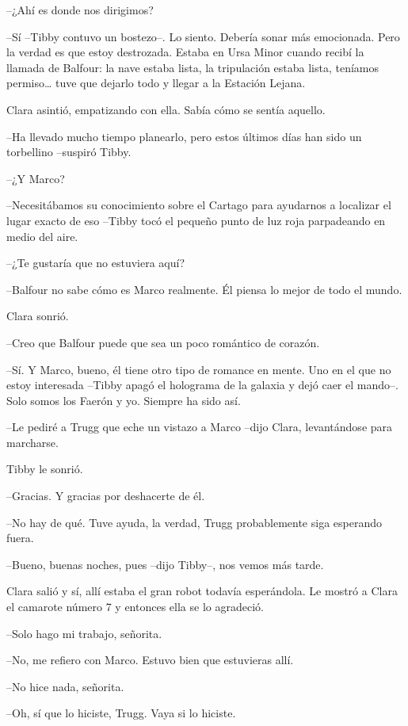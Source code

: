 {--¿Ahí es donde nos dirigimos?}

{--Sí --Tibby contuvo un bostezo--. Lo siento. Debería sonar más
 emocionada. Pero la verdad es que estoy destrozada. Estaba en Ursa Minor
 cuando recibí la llamada de Balfour: la nave estaba lista, la
 tripulación estaba lista, teníamos permiso\ldots{} tuve que dejarlo todo
y llegar a la Estación Lejana.}

{Clara asintió, empatizando con ella. Sabía cómo se sentía aquello.}

{--Ha llevado mucho tiempo planearlo, pero estos últimos días han sido un
torbellino --suspiró Tibby.}

{--¿Y Marco?}

{--Necesitábamos su conocimiento sobre el Cartago para ayudarnos a
 localizar el lugar exacto de eso --Tibby tocó el pequeño punto de luz
roja parpadeando en medio del aire.}

{--¿Te gustaría que no estuviera aquí?}

{--Balfour no sabe cómo es Marco realmente. Él piensa lo mejor de todo el
mundo.}

{Clara sonrió.}

{--Creo que Balfour puede que sea un poco romántico de corazón.}

{--Sí. Y Marco, bueno, él tiene otro tipo de romance en mente. Uno en el
 que no estoy interesada --Tibby apagó el holograma de la galaxia y dejó
caer el mando--. Solo somos los Faerón y yo. Siempre ha sido así.}

{--Le pediré a Trugg que eche un vistazo a Marco --dijo Clara,
levantándose para marcharse.}

{Tibby le sonrió.}

{--Gracias. Y gracias por deshacerte de él.}

{--No hay de qué. Tuve ayuda, la verdad, Trugg probablemente siga
esperando fuera.}

{--Bueno, buenas noches, pues --dijo Tibby--, nos vemos más tarde.}

{Clara salió y sí, allí estaba el gran robot todavía esperándola. Le
mostró a Clara el camarote número 7 y entonces ella se lo agradeció.}

{--Solo hago mi trabajo, señorita.}

{--No, me refiero con Marco. Estuvo bien que estuvieras allí.}

{--No hice nada, señorita.}

{--Oh, sí que lo hiciste, Trugg. Vaya si lo
hiciste.}

